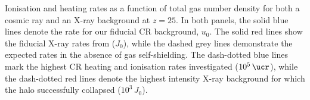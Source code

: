 Ionisation and heating rates as a function of total gas number density for both a cosmic ray and an X-ray background at $z=25$. In both panels, the solid blue lines denote the rate for our fiducial CR background, $u_0$. The solid red lines show the fiducial X-ray rates from \citet{Hummeletal2015} ($J_0$), while the dashed grey lines demonstrate the expected rates in the absence of gas self-shielding.  The dash-dotted blue lines mark the highest CR heating and ionisation rates investigated ($10^5\,\ucr$), while the dash-dotted red lines denote the highest intensity X-ray background for which the halo successfully collapsed ($10^3\,J_0$).